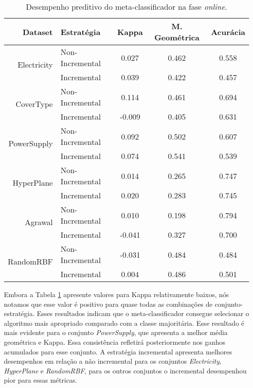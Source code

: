\begin{table}[ht]
\caption{Desempenho preditivo do meta-classificador na fase \textit{online}.}
\label{tab:onmetrics}
\centering
\begin{tabular}{r|l|c|c|c} \hline
Dataset     &  Estratégia    & Kappa & M. Geométrica & Acurácia \\ \hline
\multirow{2}{*}{Electricity} &  Non-Incremental      & 0.027 & 0.462  & 0.558    \\
            &  Incremental & 0.039 & 0.422  & 0.457    \\ \hline
\multirow{2}{*}{CoverType}   &  Non-Incremental       & 0.114 & 0.461  & 0.694    \\
            &  Incremental & -0.009 & 0.405  & 0.631    \\ \hline
\multirow{2}{*}{PowerSupply} &  Non-Incremental      & 0.092 & 0.502  & 0.607    \\
            &  Incremental & 0.074 & 0.541  & 0.539 \\ \hline
\multirow{2}{*}{HyperPlane}   &  Non-Incremental       & 0.014 & 0.265  & 0.747    \\
            &  Incremental & 0.020 & 0.283  & 0.745    \\ \hline
\multirow{2}{*}{Agrawal}   &  Non-Incremental       & 0.010 & 0.198  & 0.794    \\
            &  Incremental & -0.041 & 0.327  & 0.700    \\ \hline
\multirow{2}{*}{RandomRBF}   &  Non-Incremental       & -0.031 & 0.484  & 0.484    \\
            &  Incremental & 0.004 & 0.486  & 0.501
\end{tabular}
\end{table}

Embora a Tabela \ref{tab:onmetrics} apresente valores para Kappa relativamente baixos, nós notamos que esse valor é positivo para quase todas as combinações de conjunto-estratégia. Esses resultados indicam que o meta-classificador consegue selecionar o algoritmo mais apropriado comparado com a classe majoritária. Esse resultado é mais evidente para o conjunto \textit{PowerSupply}, que apresenta a melhor média geométrica e Kappa. Essa consistência refletirá posteriormente nos ganhos acumulados para esse conjunto. A estratégia incremental apresenta melhores desempenhos em relação a não incremental para os conjuntos \textit{Electricity}, \textit{HyperPlane} e \textit{RandomRBF}, para os outros conjuntos o incremental desempenhou pior para essas métricas.

